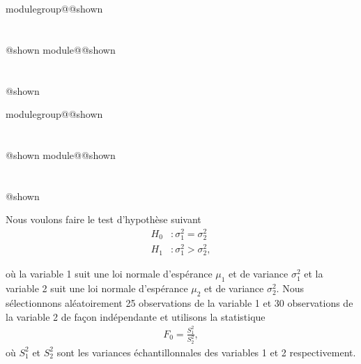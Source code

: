 \documentclass{Evaluation}
\makeatletter
\newcommand{\currentmodulekey}{}
\newcommand{\currentmoduletitle}{}
\newcommand{\currentgroupkey}{}
\newcommand{\currentgrouptitle}{}
\newcommand{\showmoduleifneeded}{%
  \ifx\currentgroupkey\empty\else
    \expandafter\ifx\csname modulegroup@\currentgroupkey @shown\endcsname\relax
      \section*{\currentgrouptitle}%
      \expandafter\gdef\csname modulegroup@\currentgroupkey @shown\endcsname{1}%
    \fi
  \fi
  \expandafter\ifx\csname module@\currentmodulekey @shown\endcsname\relax
    \section*{\currentmoduletitle}%
    \expandafter\gdef\csname module@\currentmodulekey @shown\endcsname{1}%
  \fi
}
\newenvironment{H24}{\showmoduleifneeded}{}
\newenvironment{A24}{\showmoduleifneeded}{}
\makeatother
\begin{document}
\begin{questions}
\begin{H24}
\begin{solution}
	\end{solution}
\end{H24}

\begin{A24}
\question {} %
Nous voulons faire le test d'hypothèse suivant
\begin{align*}
H_0 &:\sigma_1^2 = \sigma_2^2\\
H_1 &:\sigma_1^2 > \sigma_2^2,
\end{align*}

où la variable 1 suit une loi normale d'espérance $\mu_1$ et de variance $\sigma_1^2$ et la variable 2 suit une loi normale d'espérance $\mu_2$ et de variance $\sigma_2^2$. Nous sélectionnons aléatoirement 25 observations de la variable 1 et 30 observations de la variable 2 de façon indépendante et utilisons la statistique
\begin{align*}
    F_0=\frac{S_1^2}{S_2^2},
\end{align*}
où $S_1^2$ et $S_2^2$ sont les variances échantillonnales des variables 1 et 2 respectivement.

\end{A24}
\end{questions}
\end{document}
